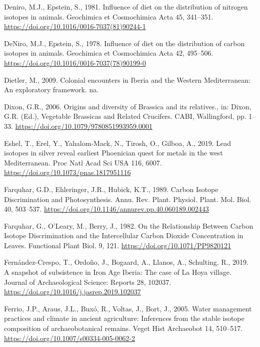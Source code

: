 \documentclass[preprint, 3p, authoryear]{elsarticle} %
\newlength{\cslhangindent}
\newlength{\cslentryspacingunit} %
\newenvironment{CSLReferences}[2] %
 {%
  \setlength{\parindent}{0pt}
  \ifodd #1
  \let\oldpar\par
  \def\par{\hangindent=\cslhangindent\oldpar}
  \fi
  \setlength{\parskip}{#2\cslentryspacingunit}
 }%
 {}
\begin{document}
\begin{CSLReferences}{1}{0}
\leavevmode{}%
Deniro, M.J., Epstein, S., 1981. Influence of diet on the distribution of nitrogen isotopes in animals. Geochimica et Cosmochimica Acta 45, 341--351. \url{https://doi.org/10.1016/0016-7037(81)90244-1}

\leavevmode{}%
DeNiro, M.J., Epstein, S., 1978. Influence of diet on the distribution of carbon isotopes in animals. Geochimica et Cosmochimica Acta 42, 495--506. \url{https://doi.org/10.1016/0016-7037(78)90199-0}

\leavevmode{}%
Dietler, M., 2009. Colonial encounters in {Iberia} and the {Western Mediterranean}: {An} exploratory framework. {na}.

\leavevmode{}%
Dixon, G.R., 2006. Origins and diversity of {Brassica} and its relatives., in: Dixon, G.R. (Ed.), Vegetable Brassicas and Related Crucifers. {CABI}, {Wallingford}, pp. 1--33. \url{https://doi.org/10.1079/9780851993959.0001}

\leavevmode{}%
Eshel, T., Erel, Y., Yahalom-Mack, N., Tirosh, O., Gilboa, A., 2019. Lead isotopes in silver reveal earliest {Phoenician} quest for metals in the west {Mediterranean}. Proc Natl Acad Sci USA 116, 6007. \url{https://doi.org/10.1073/pnas.1817951116}

\leavevmode{}%
Farquhar, G.D., Ehleringer, J.R., Hubick, K.T., 1989. Carbon {Isotope Discrimination} and {Photosynthesis}. Annu. Rev. Plant. Physiol. Plant. Mol. Biol. 40, 503--537. \url{https://doi.org/10.1146/annurev.pp.40.060189.002443}

\leavevmode{}%
Farquhar, G., O'Leary, M., Berry, J., 1982. On the {Relationship Between Carbon Isotope Discrimination} and the {Intercellular Carbon Dioxide Concentration} in {Leaves}. Functional Plant Biol. 9, 121. \url{https://doi.org/10.1071/PP9820121}

\leavevmode{}%
Fernández-Crespo, T., Ordoño, J., Bogaard, A., Llanos, A., Schulting, R., 2019. A snapshot of subsistence in {Iron Age Iberia}: {The} case of {La Hoya} village. Journal of Archaeological Science: Reports 28, 102037. \url{https://doi.org/10.1016/j.jasrep.2019.102037}

\leavevmode{}%
Ferrio, J.P., Araus, J.L., Buxó, R., Voltas, J., Bort, J., 2005. Water management practices and climate in ancient agriculture: Inferences from the stable isotope composition of archaeobotanical remains. Veget Hist Archaeobot 14, 510--517. \url{https://doi.org/10.1007/s00334-005-0062-2}


\end{CSLReferences}
\end{document}
